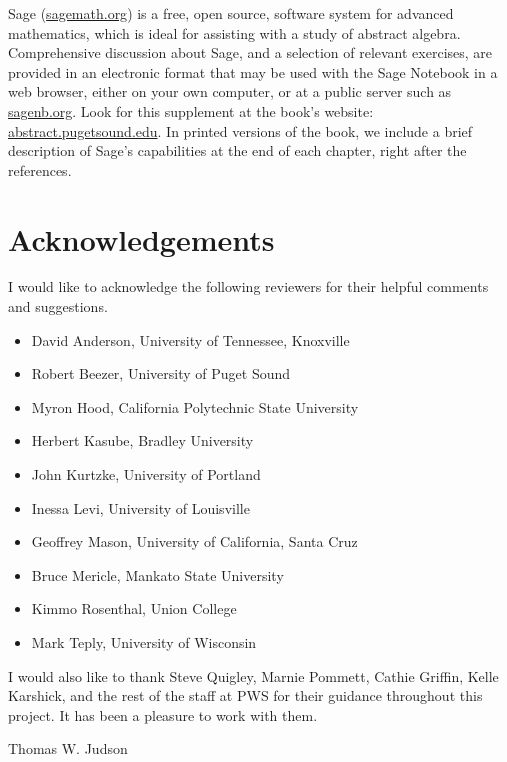 Sage (\url{sagemath.org}) is a free, open source, software system
for advanced mathematics, which is ideal for assisting with a study
of abstract algebra. Comprehensive discussion about Sage, and a
selection of relevant exercises, are provided in an electronic
format that may be used with the Sage Notebook in a web browser,
either on your own computer, or at a public server such as
\url{sagenb.org}.  Look for this supplement at the book's
website: \url{abstract.pugetsound.edu}.  In printed
versions of the book, we include a brief description of Sage's
capabilities at the end of each chapter, right after the references.

\section*{Acknowledgements}

I would like to acknowledge the following reviewers for their helpful
comments and suggestions. 
\begin{itemize}
 
\item
David Anderson,
University of Tennessee, Knoxville

\item
Robert Beezer,
University of Puget Sound

\item
Myron Hood,
California Polytechnic State University

\item
Herbert Kasube,
Bradley University

\item
John Kurtzke,
University of Portland
 
\item
Inessa Levi,
University of Louisville
 
\item
Geoffrey Mason,
University of California, Santa Cruz

\item
Bruce Mericle,
Mankato State University
 
\item
Kimmo Rosenthal,
Union College

\item
Mark Teply,
University of Wisconsin

\end{itemize}
I would also like to thank Steve Quigley, Marnie Pommett, Cathie
Griffin, Kelle Karshick, and the rest of the staff at PWS for their
guidance throughout this project. It has been a pleasure to work with
them. 

 
\begin{flushright}
Thomas W. Judson
\end{flushright}
 
 
\pagestyle{headings}
 
 
 
 
